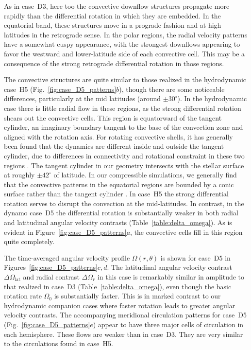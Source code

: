 As in case~D3, here too the convective downflow structures propagate
more rapidly than the differential rotation in which they are embedded.
In the equatorial band, these structures move in
a prograde fashion and at high latitudes in the retrograde sense.  In
the polar regions, the radial velocity patterns have a somewhat cuspy
appearance, with the strongest downflows appearing to favor the
westward and lower-latitude side of each convective cell.  This may be
a consequence of the strong retrograde differential rotation in those
regions.  


The convective structures are quite similar to those realized in the
hydrodynamic case~H5 (Fig.~\ref{fig:case_D5_patterns}$b$), though
there are some noticeable differences, particularly at the mid
latitudes (around $\pm30^\circ$).  In the hydrodynamic case there is
little radial flow in these regions, as the strong differential
rotation shears out the convective cells.  This region is
equatorward of the tangent cylinder, an imaginary boundary tangent to
the base of the convection zone and aligned with the rotation axis.
For rotating convective shells, it has generally been found that the
dynamics are different inside and outside the tangent cylinder, due to
differences in connectivity and rotational constraint in these two
regions \citep[e.g.,][]{Busse_1970}.  The tangent cylinder in our geometry
intersects with the stellar surface at roughly $\pm42^\circ$ of
latitude.  In our compressible simulations, we generally find that the
convective patterns in the equatorial regions are bounded by a conic
surface rather than the tangent cylinder \citep{Brown_et_al_2008}.  In
case~H5 the strong differential rotation serves to disrupt the
convection at the mid-latitudes.  In contrast, in the dynamo case~D5
the differential rotation is substantially weaker in both radial and
latitudinal angular velocity contrasts
(Table~\ref{table:delta_omega}).  As is evident in
Figure~\ref{fig:case_D5_patterns}$a$, the convective cells fill in
this region quite completely.



The time-averaged angular velocity profile $\Omega(r,\theta)$ is shown
for case~D5 in Figures~\ref{fig:case_D5_patterns}$c,d$.   The
latitudinal angular velocity contrast $\Delta \Omega_\mathrm{lat}$ and
radial contrast $\Delta \Omega_r$ in this case is
remarkably similar in amplitude to that realized in case~D3
(Table~\ref{table:delta_omega}), even though the basic rotation rate
$\Omega_0$ is substantially faster.  This is in marked contrast to our
hydrodynamic companion cases where faster rotation leads to greater
angular velocity contrasts.  The accompanying meridional circulation patterns
for case~D5 (Fig.~\ref{fig:case_D5_patterns}$e$) appear to have three
major cells of circulation in each hemisphere.  These flows are weaker
than in case~D3.  They are very similar to the circulations found in case~H5.




